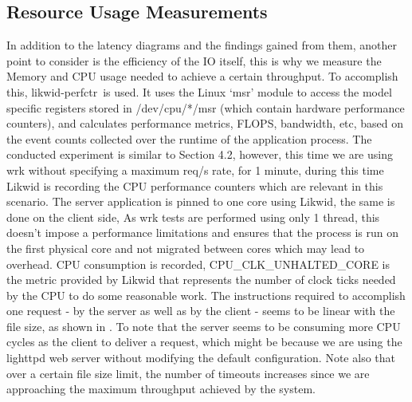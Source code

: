 \documentclass[runningheads]{llncs}
\begin{document}
\subsection{Resource Usage Measurements}
In addition to the latency diagrams and the findings gained from them, another point to consider is the efficiency of the IO itself, this is why we measure the Memory and CPU usage needed to achieve a certain throughput. To accomplish this, likwid-perfctr\,\cite{likwid} is used. It uses the Linux ‘msr’ module to access the model specific registers stored in /dev/cpu/*/msr (which contain hardware performance counters), and calculates performance metrics, FLOPS, bandwidth, etc, based on the event counts collected over the runtime of the application process.
The conducted experiment is similar to Section 4.2, however, this time we are using wrk\cite{wrkURL} without specifying a maximum req/s rate, for 1 minute, during this time Likwid is recording the CPU performance counters which are relevant in this scenario. The server application is pinned to one core using Likwid, the same is done on the client side, As wrk tests are performed using only 1 thread, this doesn’t impose a performance limitations and ensures that the process is run on the first physical core and not migrated between cores which may lead to overhead.
CPU consumption is recorded, CPU\_CLK\_UNHALTED\_CORE is the metric provided by Likwid that represents the number of clock ticks needed by the CPU to do some reasonable work. The instructions required to accomplish one request - by the server as well as by the client - seems to be linear with the file size, as shown in . To note that the server seems to be consuming more CPU cycles as the client to deliver a request, which might be because we are using the lighttpd web server without modifying the default configuration. Note also that over a certain file size limit, the number of timeouts increases since we are approaching the maximum throughput achieved by the system.
\end{document}
